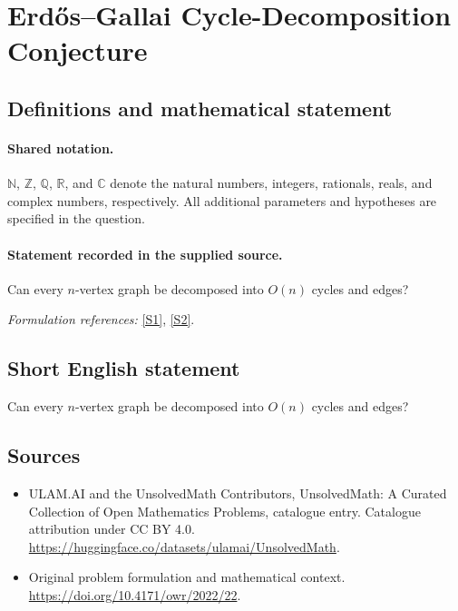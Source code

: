 \documentclass[11pt]{article}
\newcommand{\sref}[2]{\hyperlink{source:#1:#2}{[S#2]}}
\begin{document}
\section{Erdős–Gallai Cycle-Decomposition Conjecture}\label{statement}

\subsection{Definitions and mathematical statement}

\paragraph{Shared notation.}$\mathbb N$, $\mathbb Z$, $\mathbb Q$, $\mathbb R$, and $\mathbb C$ denote the natural numbers, integers, rationals, reals, and complex numbers, respectively. All additional parameters and hypotheses are specified in the question.


\paragraph{Statement recorded in the supplied source.}
Can every $n$-vertex graph be decomposed into $O(n)$ cycles and edges?
\par\smallskip\textit{Formulation references:} \sref{statement}{1}, \sref{statement}{2}.
\subsection{Short English statement}
Can every $n$-vertex graph be decomposed into $O(n)$ cycles and edges?
\subsection{Sources}
\begin{itemize}
\item[\hypertarget{source:statement:1}{S1}] ULAM.AI and the UnsolvedMath Contributors, UnsolvedMath: A Curated Collection of Open Mathematics Problems, catalogue entry. Catalogue attribution under CC BY 4.0.
\url{https://huggingface.co/datasets/ulamai/UnsolvedMath}.
\item[\hypertarget{source:statement:2}{S2}] Original problem formulation and mathematical context.
\url{https://doi.org/10.4171/owr/2022/22}.
\end{itemize}
\label{end:statement}
\end{document}
